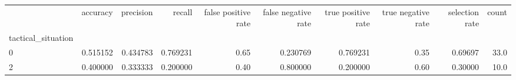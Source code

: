 \begin{tabular}{lrrrrrrrrr}
\toprule
{} &  accuracy &  precision &    recall &  false positive rate &  false negative rate &  true positive rate &  true negative rate &  selection rate &  count \\
tactical\_situation &           &            &           &                      &                      &                     &                     &                 &        \\
\midrule
0                  &  0.515152 &   0.434783 &  0.769231 &                 0.65 &             0.230769 &            0.769231 &                0.35 &         0.69697 &   33.0 \\
2                  &  0.400000 &   0.333333 &  0.200000 &                 0.40 &             0.800000 &            0.200000 &                0.60 &         0.30000 &   10.0 \\
\bottomrule
\end{tabular}
